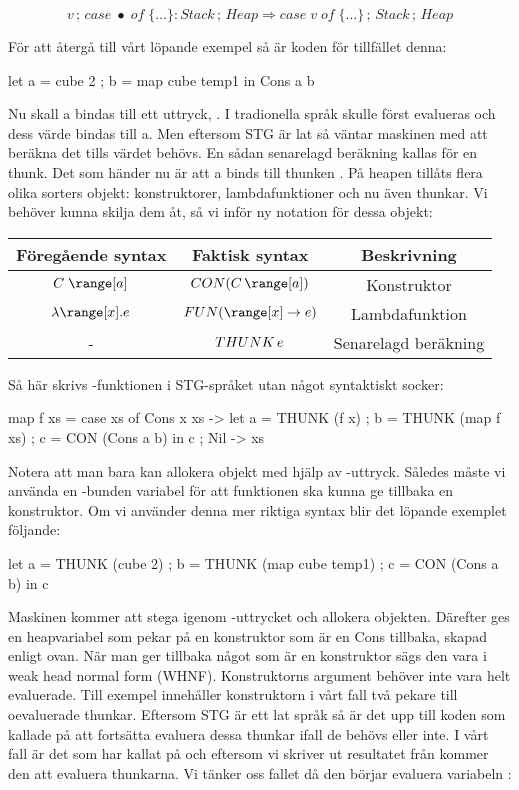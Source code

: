 \documentclass[../Core]{subfiles}
\begin{document}
\[
v\,;\, case\;\bullet\; of\;\{\ldots\}:Stack\,;\, Heap\Rightarrow case\; v\; of\;\{\ldots\}\,;\, Stack\,;\, Heap\]


För att återgå till vårt löpande exempel så är koden för tillfället denna:

\begin{codeEx}
let { a = cube 2
    ; b = map cube temp1
    } in Cons a b
\end{codeEx}

Nu skall a bindas till ett uttryck, . I tradionella språk skulle
 först evalueras och dess värde bindas till a. Men eftersom STG
är lat så väntar maskinen med att beräkna det tills värdet behövs.
En sådan senarelagd beräkning kallas för en thunk. Det som händer nu är att
a binds till thunken . På heapen tillåts flera olika
sorters objekt: konstruktorer, lambdafunktioner och nu även thunkar.
Vi behöver kunna skilja dem åt, så vi inför ny notation för dessa objekt:

\begin{tabular}{ccc}
Föregående syntax & Faktisk syntax & Beskrivning\tabularnewline
\hline
$C\;\range[a]$ & $\CON C{\range[a]}$ & Konstruktor\tabularnewline
$\lambda\range[x].e$ & $\FUN{\range[x]}e$ & Lambdafunktion\tabularnewline
- & $THUNK\,e$ & Senarelagd beräkning\tabularnewline
\end{tabular}

Så här skrivs -funktionen i STG-språket utan något syntaktiskt socker:

\begin{codeEx}
map f xs = case xs of
    { Cons x xs -> let { a = THUNK (f x) 
                       ; b = THUNK (map f xs)
                       ; c = CON (Cons a b)
                       } in c
    ; Nil       -> xs
    }
\end{codeEx}

Notera att man bara kan allokera objekt med hjälp av -uttryck. Således
måste vi använda en -bunden variabel  för att funktionen ska kunna ge tillbaka en konstruktor.
Om vi använder denna mer riktiga syntax blir det löpande exemplet följande:

\begin{codeEx}
let { a = THUNK (cube 2)
    ; b = THUNK (map cube temp1)
    ; c = CON (Cons a b)
    } in c
\end{codeEx}

Maskinen kommer att stega igenom -uttrycket och allokera objekten.
Därefter ges en heapvariabel som pekar på en konstruktor
som är en Cons tillbaka, skapad enligt ovan. När man ger tillbaka något som är
en konstruktor sägs den vara i weak head normal form (WHNF). Konstruktorns
argument behöver inte vara helt evaluerade. Till exempel innehåller konstruktorn i vårt fall
två pekare till oevaluerade thunkar. Eftersom STG är ett
lat språk så är det upp till koden som kallade på  att fortsätta
evaluera dessa thunkar ifall de behövs eller inte. I vårt fall är
det  som har kallat på  och eftersom vi skriver ut resultatet från 
kommer den att evaluera thunkarna. Vi tänker oss fallet då den börjar evaluera variabeln :
\end{document}
